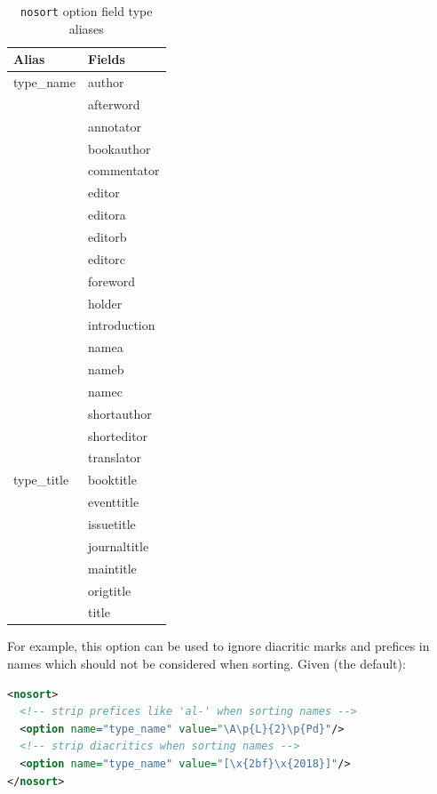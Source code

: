 \documentclass{ltxdockit}
\begin{document}
\begin{table}
\begin{center}
\small
\begin{tabular}{ll}
\toprule
Alias & Fields\\
\midrule
type\_name & author\\
          & afterword\\
          & annotator\\
          & bookauthor\\
          & commentator\\
          & editor\\
          & editora\\
          & editorb\\
          & editorc\\
          & foreword\\
          & holder\\
          & introduction\\
          & namea\\
          & nameb\\
          & namec\\
          & shortauthor\\
          & shorteditor\\
          & translator\\
type\_title & booktitle\\
           & eventtitle\\
           & issuetitle\\
           & journaltitle\\
           & maintitle\\
           & origtitle\\
           & title\\
\bottomrule
\end{tabular}
\end{center}
\caption{\texttt{nosort} option field type aliases}
\label{tab:nst}
\end{table}

For example, this option can be used to ignore diacritic marks and prefices
in names which should not be considered when sorting. Given (the default):

\begin{lstlisting}[language=xml]
<nosort>
  <!-- strip prefices like 'al-' when sorting names -->
  <option name="type_name" value="\A\p{L}{2}\p{Pd}"/>
  <!-- strip diacritics when sorting names -->
  <option name="type_name" value="[\x{2bf}\x{2018}]"/>
</nosort>
\end{lstlisting}
\end{document}
